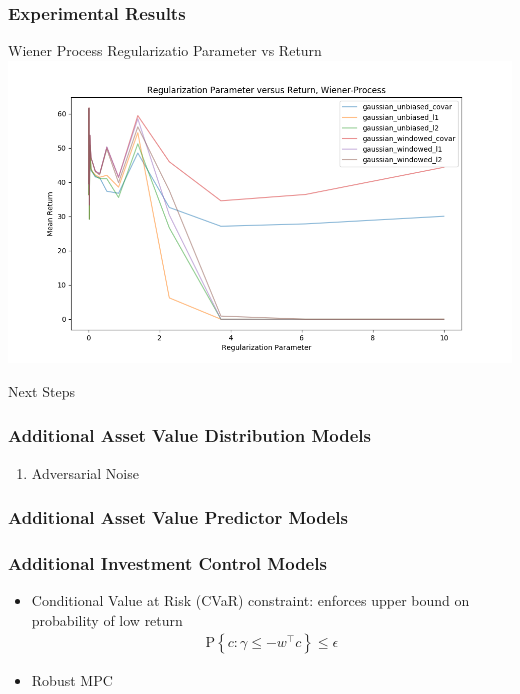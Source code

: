 \documentclass{beamer}
\begin{document}
\begin{frame}
    \frametitle{Experimental Results}

    \begin{block}{Wiener Process Regularizatio Parameter vs Return}
        \includegraphics[width=\linewidth]{gammma_vs_return-Wiener-Process.png}
    \end{block}

\end{frame}



\begin{frame}
    \Huge{\centerline{Next Steps}}
\end{frame}


\begin{frame}
    \frametitle{Additional Asset Value Distribution Models}
    \begin{enumerate}
        \item Adversarial Noise
    \end{enumerate}
\end{frame}

\begin{frame}
    \frametitle{Additional Asset Value Predictor Models}

\end{frame}

\begin{frame}
    \frametitle{Additional Investment Control Models}

    \begin{itemize}
      \item Conditional Value at Risk (CVaR) constraint: enforces upper bound on probability of low return
        \begin{align*}
          \mathrm{P}\left\{c : \gamma \leq -w^\top c \right\} \leq \epsilon
        \end{align*}

      \item Robust MPC
    \end{itemize}

\end{frame}
\end{document}
